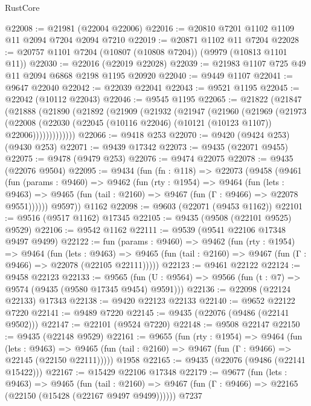 \begin{lexlean}{RustCore}
\begin{coremodule}
@22008 := @21981 (@22004 @22006)
@22016 := @20810 @7201 @1102 @1109 @11 @2094 @7204 @2094 @7210
@22019 := @20871 @1102 @11 @7204
@22028 := @20757 @1101 @7204 (@10807 (@10808 @7204)) (@9979 (@10813 @1101 @11))
@22030 := @22016 (@22019 @22028)
@22039 := @21983 @1107 @725 @49 @11 @2094 @6868 @2198 @1195 @20920
@22040 := @9449 @1107
@22041 := @9647 @22040
@22042 := @22039 @22041
@22043 := @9521 @1195
@22045 := @22042 (@10112 @22043)
@22046 := @9545 @1195
@22065 := @21822
    (@21847
      (@21888
        (@21890
          (@21892
            (@21909
              (@21932
                (@21947
                  (@21960
                    (@21969
                      (@21973
                        (@22008
                          (@22030
                            (@22045 (@10116 @22046) (@10121 (@10123 @1107)) @22006)))))))))))))
@22066 := @9418 @253
@22070 := @9420 (@9424 @253) (@9430 @253)
@22071 := @9439 @17342
@22073 := @9435 (@22071 @9455)
@22075 := @9478 (@9479 @253)
@22076 := @9474 @22075
@22078 := @9435 (@22076 @9504)
@22095 := @9434
    (fun (fn : @118) =>
    @22073
      (@9458
        (@9461
          (fun (params : @9460) =>
          @9462
            (fun (rty : @1954) =>
            @9464
              (fun (lets : @9463) =>
              @9465 (fun (tail : @2160) => @9467 (fun (Γ : @9466) => @22078 @9551))))))
        @9597))
    @1162
@22098 := @9603 (@22071 (@9453 @1162))
@22101 := @9516 (@9517 @1162) @17345
@22105 := @9435 (@9508 (@22101 @9525) @9529)
@22106 := @9542 @1162
@22111 := @9539 (@9541 @22106 @17348 @9497 @9499)
@22122 := fun (params : @9460) =>
  @9462
    (fun (rty : @1954) =>
    @9464
      (fun (lets : @9463) =>
      @9465 (fun (tail : @2160) => @9467 (fun (Γ : @9466) => @22078 (@22105 @22111)))))
@22123 := @9461 @22122
@22124 := @9458 @22123
@22133 := @9565
    (fun (U : @9564) => @9566 (fun (t : @7) => @9574 (@9435 (@9580 @17345 @9454) @9591)))
@22136 := @22098 (@22124 @22133) @17343
@22138 := @9420 @22123 @22133
@22140 := @9652 @22122 @7220
@22141 := @9489 @7220
@22145 := @9435 (@22076 (@9486 (@22141 @9502)))
@22147 := @22101 (@9524 @7220)
@22148 := @9508 @22147
@22150 := @9435 (@22148 @9529)
@22161 := @9655
    (fun (rty : @1954) =>
    @9464
      (fun (lets : @9463) =>
      @9465 (fun (tail : @2160) => @9467 (fun (Γ : @9466) => @22145 (@22150 @22111)))))
    @1958
@22165 := @9435 (@22076 (@9486 (@22141 @15422)))
@22167 := @15429 @22106 @17348
@22179 := @9677
    (fun (lets : @9463) =>
    @9465
      (fun (tail : @2160) =>
      @9467 (fun (Γ : @9466) => @22165 (@22150 (@15428 (@22167 @9497 @9499))))))
    @7237

\end{coremodule}
\end{lexlean}
